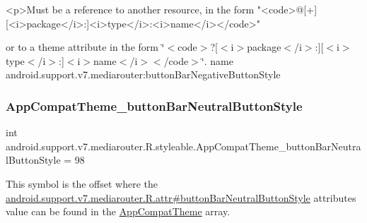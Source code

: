 \begin{DoxyVerb}      <p>Must be a reference to another resource, in the form "<code>@[+][<i>package</i>:]<i>type</i>:<i>name</i></code>"
\end{DoxyVerb}
 or to a theme attribute in the form \char`\"{}$<$code$>$?\mbox{[}$<$i$>$package$<$/i$>$\+:\mbox{]}\mbox{[}$<$i$>$type$<$/i$>$\+:\mbox{]}$<$i$>$name$<$/i$>$$<$/code$>$\char`\"{}.  name android.\+support.\+v7.\+mediarouter\+:button\+Bar\+Negative\+Button\+Style \mbox{\label{classandroid_1_1support_1_1v7_1_1mediarouter_1_1R_1_1styleable_aff182cdd74b6dce4c8c16447cb6760e6}} 
\subsubsection{\texorpdfstring{App\+Compat\+Theme\+\_\+button\+Bar\+Neutral\+Button\+Style}{AppCompatTheme\_buttonBarNeutralButtonStyle}}
{\footnotesize\ttfamily int android.\+support.\+v7.\+mediarouter.\+R.\+styleable.\+App\+Compat\+Theme\+\_\+button\+Bar\+Neutral\+Button\+Style = 98\hspace{0.3cm}{\ttfamily [static]}}

This symbol is the offset where the \hyperlink{classandroid_1_1support_1_1v7_1_1mediarouter_1_1R_1_1attr_a8980e0e83b1fb7c718436d854918c903}{android.\+support.\+v7.\+mediarouter.\+R.\+attr\#button\+Bar\+Neutral\+Button\+Style} attribute\textquotesingle{}s value can be found in the \hyperlink{classandroid_1_1support_1_1v7_1_1mediarouter_1_1R_1_1styleable_a4e3d3900c75d49aeb2f283cac00214d6}{App\+Compat\+Theme} array.


